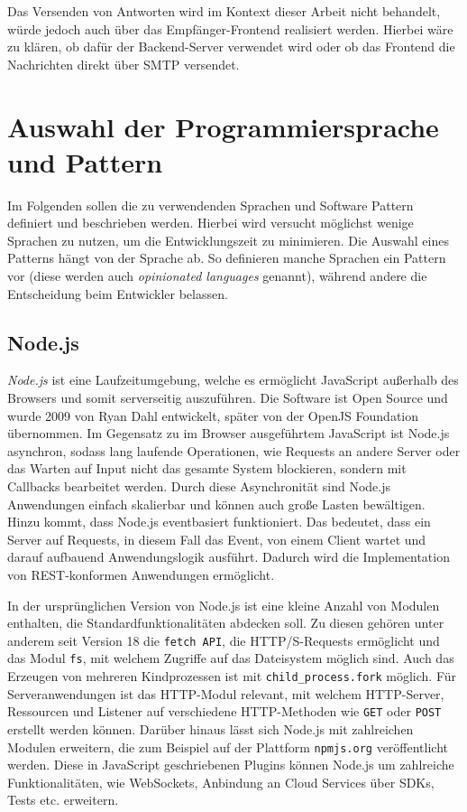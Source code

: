 Das Versenden von Antworten wird im Kontext dieser Arbeit nicht behandelt, würde jedoch auch über das Empfänger-Frontend realisiert werden. Hierbei wäre zu klären, ob dafür der Backend-Server verwendet wird oder ob das Frontend die Nachrichten direkt über SMTP versendet.


\section{Auswahl der Programmiersprache und Pattern}
\label{Auswahl_der_Technologie_und_Designpattern}

Im Folgenden sollen die zu verwendenden Sprachen und Software Pattern definiert und beschrieben werden. Hierbei wird versucht möglichst wenige Sprachen zu nutzen, um die Entwicklungszeit zu minimieren. Die Auswahl eines Patterns hängt von der Sprache ab. So definieren manche Sprachen ein Pattern vor (diese werden auch \emph{opinionated languages} genannt), während andere die Entscheidung beim Entwickler belassen.

\subsection{Node.js}
\label{Node.js}

\textit{Node.js} ist eine Laufzeitumgebung, welche es ermöglicht JavaScript außerhalb des Browsers und somit serverseitig auszuführen. Die Software ist Open Source und wurde 2009 von Ryan Dahl entwickelt, später von der OpenJS Foundation übernommen. Im Gegensatz zu im Browser ausgeführtem JavaScript ist Node.js asynchron, sodass lang laufende Operationen, wie Requests an andere Server oder das Warten auf Input nicht das gesamte System blockieren, sondern mit Callbacks bearbeitet werden. Durch diese Asynchronität sind Node.js Anwendungen einfach skalierbar und können auch große Lasten bewältigen. Hinzu kommt, dass Node.js eventbasiert funktioniert. Das bedeutet, dass ein Server auf Requests, in diesem Fall das Event, von einem Client wartet und darauf aufbauend Anwendungslogik ausführt. Dadurch wird die Implementation von REST-konformen Anwendungen ermöglicht. \citep{OpenJSFoundation2022}

In der ursprünglichen Version von Node.js ist eine kleine Anzahl von Modulen enthalten, die Standardfunktionalitäten abdecken soll. Zu diesen gehören unter anderem seit Version 18 die \texttt{fetch API}, die HTTP/S-Requests ermöglicht und das Modul \texttt{fs}, mit welchem Zugriffe auf das Dateisystem möglich sind. Auch das Erzeugen von mehreren Kindprozessen ist mit \texttt{child\_process.fork} möglich. Für Serveranwendungen ist das HTTP-Modul relevant, mit welchem HTTP-Server, Ressourcen und Listener auf verschiedene HTTP-Methoden wie \texttt{GET} oder \texttt{POST} erstellt werden können. Darüber hinaus lässt sich Node.js mit zahlreichen Modulen erweitern, die zum Beispiel auf der Plattform \texttt{npmjs.org} veröffentlicht werden. Diese in JavaScript geschriebenen Plugins können Node.js um zahlreiche Funktionalitäten, wie WebSockets, Anbindung an Cloud Services über SDKs, Tests etc. erweitern.

